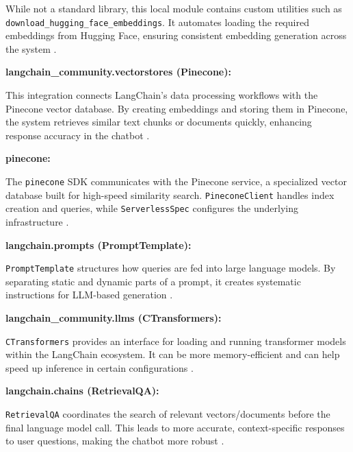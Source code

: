 \noindent
While not a standard library, this local module contains custom utilities such as \texttt{download\_hugging\_face\_embeddings}. 
It automates loading the required embeddings from Hugging Face, ensuring consistent embedding generation 
across the system \cite{pythonlibrary}.

\vspace{0.4cm}
\noindent\textbf{langchain\_community.vectorstores (Pinecone):}

\noindent
This integration connects LangChain’s data processing workflows with the Pinecone vector database. By creating embeddings 
and storing them in Pinecone, the system retrieves similar text chunks or documents quickly, enhancing response accuracy 
in the chatbot \cite{pythonlibrary}.

\vspace{0.4cm}
\noindent\textbf{pinecone:}

\noindent
The \texttt{pinecone} SDK communicates with the Pinecone service, a specialized vector database built for high-speed 
similarity search. \texttt{PineconeClient} handles index creation and queries, while \texttt{ServerlessSpec} configures 
the underlying infrastructure \cite{pythonlibrary}.

\vspace{0.4cm}
\noindent\textbf{langchain.prompts (PromptTemplate):}

\noindent
\texttt{PromptTemplate} structures how queries are fed into large language models. By separating static and dynamic 
parts of a prompt, it creates systematic instructions for LLM-based generation \cite{pythonlibrary}.

\vspace{0.4cm}
\noindent\textbf{langchain\_community.llms (CTransformers):}

\noindent
\texttt{CTransformers} provides an interface for loading and running transformer models within the LangChain ecosystem. 
It can be more memory-efficient and can help speed up inference in certain configurations \cite{pythonlibrary}.

\vspace{0.4cm}
\noindent\textbf{langchain.chains (RetrievalQA):}

\noindent
\texttt{RetrievalQA} coordinates the search of relevant vectors/documents before the final language model call. 
This leads to more accurate, context-specific responses to user questions, making the chatbot more robust \cite{pythonlibrary}.

